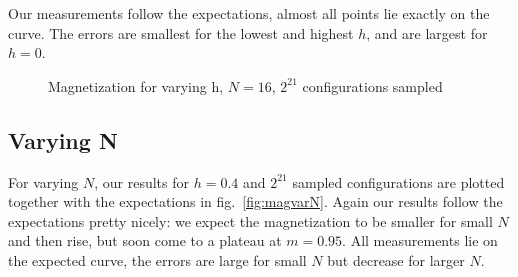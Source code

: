 \documentclass{scrartcl}
\begin{document}
Our measurements follow the expectations, almost all points lie exactly on the curve. The errors are smallest for the lowest and highest $h$, and are largest for $h=0$.

	\begin{figure}[htbp]
		
		\caption{Magnetization for varying h, $N=16$, $2^{21}$ configurations sampled}
		\label{fig:magvarh}
	\end{figure}
	
\subsection{Varying N}

For varying $N$, our results for $h=0.4$ and $2^{21}$ sampled configurations are plotted together with the expectations in fig.~\ref{fig:magvarN}. Again our results follow the expectations pretty nicely: we expect the magnetization to be smaller for small $N$ and then rise, but soon come to a plateau at $m=0.95$. All measurements lie on the expected curve, the errors are large for small $N$ but decrease for larger $N$.


\end{document}
